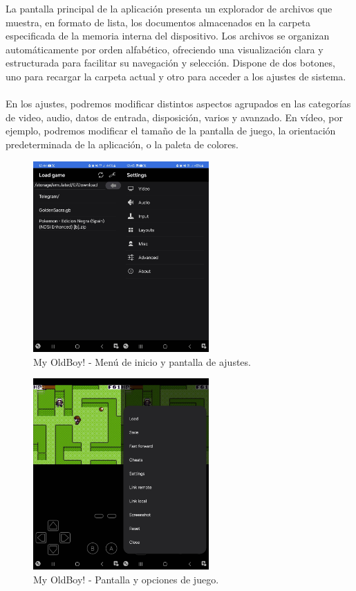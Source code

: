 La pantalla principal de la aplicación presenta un explorador de archivos que muestra, en formato de lista, los documentos almacenados en la carpeta especificada de la memoria interna del dispositivo. Los archivos se organizan automáticamente por orden alfabético, ofreciendo una visualización clara y estructurada para facilitar su navegación y selección. Dispone de dos botones, uno para recargar la carpeta actual y otro para acceder a los ajustes de sistema. 
\\\\
En los ajustes, podremos modificar distintos aspectos agrupados en las categorías de video, audio, datos de entrada, disposición, varios y avanzado. En vídeo, por ejemplo, podremos modificar el tamaño de la pantalla de juego, la orientación predeterminada de la aplicación, o la paleta de colores.

\begin{figure}[H]
    \centering
    \includegraphics[width=0.6\textwidth]{include/images/myoldboy2.jpg}
    \caption{My OldBoy! - Menú de inicio y pantalla de ajustes.}
    \label{figure:oldboy2}
\end{figure}

\begin{figure}[H]
    \centering
    \includegraphics[width=0.6\textwidth]{include/images/myoldboy3.jpg}
    \caption{My OldBoy! - Pantalla y opciones de juego.}
    \label{figure:oldboy3}
\end{figure}


